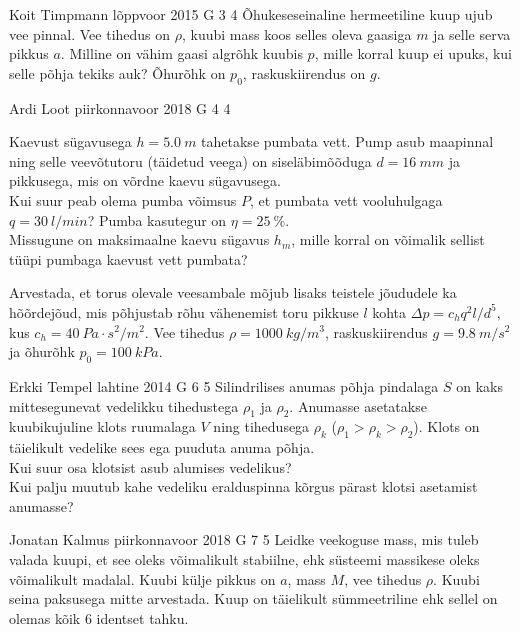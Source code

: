 \documentclass[11pt, twoside]{article}
\begin{document}
{%
{Koit Timpmann} %
{lõppvoor} %
{2015} %
{G 3} %
{4} %
{
\ifStatement
Õhukeseseinaline hermeetiline kuup ujub vee pinnal. Vee tihedus on $\rho$, kuubi mass koos selles oleva gaasiga $m$ ja selle serva pikkus $a$. Milline on vähim gaasi algrõhk kuubis $p$, mille korral kuup ei upuks, kui selle põhja tekiks auk? Õhurõhk on $p_0$, raskuskiirendus on $g$.
\fi
}

{Ardi Loot} %
{piirkonnavoor} %
{2018} %
{G 4} %
{4} %
{
\ifStatement
Kaevust sügavusega $h=\SI{5.0}{m}$ tahetakse pumbata vett. Pump asub
maapinnal ning selle veevõtutoru (täidetud veega) on siseläbimõõduga
$d=\SI{16}{mm}$ ja pikkusega, mis on võrdne kaevu sügavusega.\\
\osa Kui suur peab olema pumba võimsus $P$, et pumbata vett vooluhulgaga
$q=\SI{30}{l/min}$? Pumba kasutegur on $\eta=\SI{25}{\percent}$.\\
\osa Missugune on maksimaalne kaevu sügavus $h_{m}$, mille korral on
võimalik sellist tüüpi pumbaga kaevust vett pumbata?

Arvestada, et torus olevale veesambale mõjub lisaks teistele jõududele
ka hõõrdejõud, mis põhjustab rõhu vähenemist toru pikkuse $l$ kohta $\Delta p=c_{h}q^{2}l/d^{5},$
kus $c_{h}=\SI{40}{Pa\cdot s^{2}/m^{2}}.$ Vee tihedus $\rho=\SI{1000}{kg/m^{3}}$,
raskuskiirendus $g=\SI{9.8}{m/s^{2}}$ ja õhurõhk $p_{0}=\SI{100}{kPa}.$
\fi
}

{Erkki Tempel} %
{lahtine} %
{2014} %
{G 6} %
{5} %
{
\ifStatement
Silindrilises anumas põhja pindalaga $S$ on kaks mittesegunevat vedelikku tihedustega $\rho_1$ ja $\rho_2$. Anumasse asetatakse kuubikujuline klots ruumalaga $V$ ning tihedusega $\rho_k$ ($\rho_1>\rho_k>\rho_2$). Klots on täielikult vedelike sees ega puuduta anuma põhja.\\
\osa Kui suur osa klotsist asub alumises vedelikus?\\
\osa Kui palju muutub kahe vedeliku eralduspinna kõrgus pärast klotsi asetamist anumasse?
\fi
}

{Jonatan Kalmus} %
{piirkonnavoor} %
{2018} %
{G 7} %
{5} %
{
\ifStatement
Leidke veekoguse mass, mis tuleb valada kuupi, et see oleks võimalikult stabiilne, ehk süsteemi massikese oleks võimalikult madalal. Kuubi külje pikkus on $a$, mass $M$, vee tihedus $\rho$. Kuubi seina paksusega mitte arvestada. Kuup on täielikult sümmeetriline ehk sellel on olemas kõik 6 identset tahku.
\fi
}

}
\end{document}
